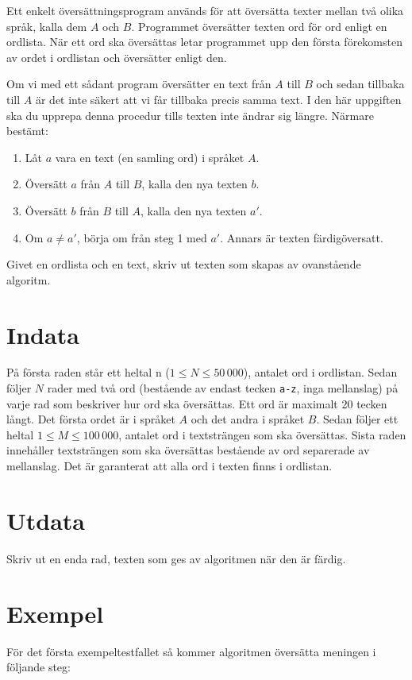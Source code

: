 Ett enkelt översättningsprogram används för att översätta texter mellan två
olika språk, kalla dem $A$ och $B$. Programmet översätter texten ord för ord enligt
en ordlista. När ett ord ska översättas letar programmet upp den första
förekomsten av ordet i ordlistan och översätter enligt den. 

Om vi med ett sådant program översätter en text från $A$ till $B$ och sedan tillbaka till $A$ är det inte säkert att vi får tillbaka precis samma text. I den här uppgiften ska du upprepa denna procedur tills texten inte ändrar sig längre. Närmare bestämt:
\begin{enumerate}
    \item Låt $a$ vara en text (en samling ord) i språket $A$.
    \item Översätt $a$ från $A$ till $B$, kalla den nya texten $b$.
    \item Översätt $b$ från $B$ till $A$, kalla den nya texten $a'$.
    \item Om $a \not = a'$, börja om från steg 1 med $a'$. Annars är texten färdigöversatt.
\end{enumerate}

Givet en ordlista och en text, skriv ut texten som skapas av ovanstående algoritm.

\section*{Indata}
På första raden står ett heltal n ($1 \leq N \leq 50\,000$), antalet ord i ordlistan.
Sedan följer $N$ rader med två ord (bestående av endast tecken \texttt{a-z},
inga mellanslag) på varje rad som beskriver hur ord ska översättas. Ett ord är maximalt 20 tecken långt.
Det första ordet är i språket $A$ och det andra i språket $B$.  Sedan följer ett heltal $1 \leq M \leq 100\,000$,
antalet ord i textsträngen som ska översättas. Sista raden innehåller textsträngen som ska översättas
bestående av ord separerade av mellanslag. Det är garanterat
att alla ord i texten finns i ordlistan.

\section*{Utdata}
Skriv ut en enda rad, texten som ges av algoritmen när den är färdig.

\section*{Exempel}
För det första exempeltestfallet så kommer algoritmen översätta meningen i följande steg:

